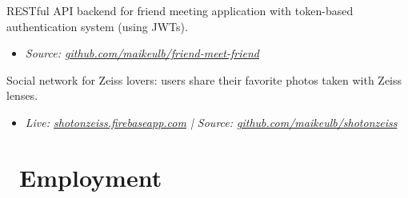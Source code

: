 \documentclass{resume}
\begin{document}

RESTful API backend for friend meeting application with token-based authentication system (using JWTs).
\begin{itemize}
   \item \textit{Source: \href{https://github.com/maikeulb/friend-meet-friend}{github.com/maikeulb/friend-meet-friend}}
\end{itemize}


Social network for Zeiss lovers: users share their favorite photos taken with
Zeiss lenses.
\begin{itemize}
   \item \textit{Live: \href{https://shotonzeiss.firebaseapp.com}{shotonzeiss.firebaseapp.com} |
                 Source: \href{https://github.com/maikeulb/shotonzeiss}{github.com/maikeulb/shotonzeiss}}
\end{itemize}


\section{\faUsers\ Employment}
\end{document}
